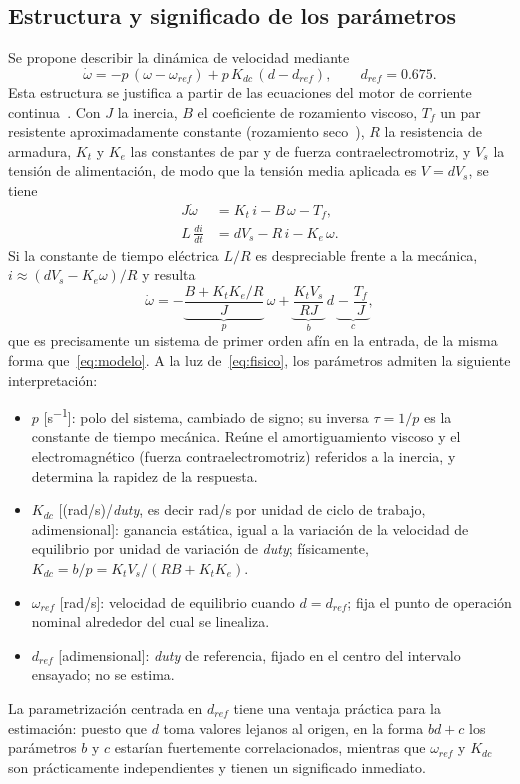 \documentclass[journal,10pt,a4paper]{IEEEtran}
\begin{document}
\subsection{Estructura y significado de los parámetros}
Se propone describir la dinámica de velocidad mediante
\begin{equation}
\dot\omega=-p\,(\omega-\omega_{ref})+p\,K_{dc}\,(d-d_{ref}),\qquad d_{ref}=0.675.
\label{eq:modelo}
\end{equation}
Esta estructura se justifica a partir de las ecuaciones del motor de corriente continua~\cite{franklin}. Con $J$ la inercia, $B$ el coeficiente de rozamiento viscoso, $T_f$ un par resistente aproximadamente constante (rozamiento seco~\cite{armstrong}), $R$ la resistencia de armadura, $K_t$ y $K_e$ las constantes de par y de fuerza contraelectromotriz, y $V_s$ la tensión de alimentación, de modo que la tensión media aplicada es $V=dV_s$, se tiene
\begin{align}
J\dot\omega&=K_t\,i-B\,\omega-T_f,\\
L\,\tfrac{di}{dt}&=dV_s-R\,i-K_e\,\omega.
\end{align}
Si la constante de tiempo eléctrica $L/R$ es despreciable frente a la mecánica, $i\approx(dV_s-K_e\omega)/R$ y resulta
\begin{equation}
\dot\omega=-\underbrace{\frac{B+K_tK_e/R}{J}}_{p}\,\omega+\underbrace{\frac{K_tV_s}{RJ}}_{b}\,d\;\underbrace{-\;\frac{T_f}{J}}_{c},
\label{eq:fisico}
\end{equation}
que es precisamente un sistema de primer orden afín en la entrada, de la misma forma que~\eqref{eq:modelo}. A la luz de~\eqref{eq:fisico}, los parámetros admiten la siguiente interpretación:
\begin{itemize}
\item $p$ [\si{s^{-1}}]: polo del sistema, cambiado de signo; su inversa $\tau=1/p$ es la constante de tiempo mecánica. Reúne el amortiguamiento viscoso y el electromagnético (fuerza contraelectromotriz) referidos a la inercia, y determina la rapidez de la respuesta.
\item $K_{dc}$ [(rad/s)/\emph{duty}, es decir \si{rad/s} por unidad de ciclo de trabajo, adimensional]: ganancia estática, igual a la variación de la velocidad de equilibrio por unidad de variación de \emph{duty}; físicamente, $K_{dc}=b/p=K_tV_s/(RB+K_tK_e)$.
\item $\omega_{ref}$ [\si{rad/s}]: velocidad de equilibrio cuando $d=d_{ref}$; fija el punto de operación nominal alrededor del cual se linealiza.
\item $d_{ref}$ [adimensional]: \emph{duty} de referencia, fijado en el centro del intervalo ensayado; no se estima.
\end{itemize}
La parametrización centrada en $d_{ref}$ tiene una ventaja práctica para la estimación: puesto que $d$ toma valores lejanos al origen, en la forma $bd+c$ los parámetros $b$ y $c$ estarían fuertemente correlacionados, mientras que $\omega_{ref}$ y $K_{dc}$ son prácticamente independientes y tienen un significado inmediato.
\end{document}
